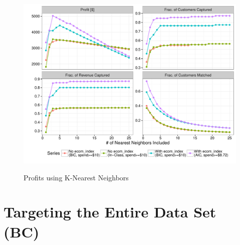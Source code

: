 

\begin{figure}[!htb]
  \centering
  \caption{Profits using K-Nearest Neighbors}
  \includegraphics[scale=.75]{profits.pdf}
  \label{fig:profits}
\end{figure}

\section{Targeting the Entire Data Set (BC)} %



% 


